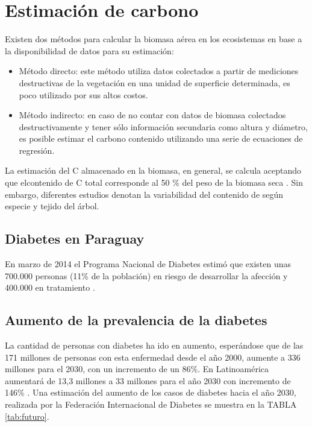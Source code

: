 \section{Estimaci\'on de carbono}
Existen dos m\'etodos para calcular la biomasa a\'erea en los ecosistemas en base a la disponibilidad de datos para su estimaci\'on\cite{pinaestimacion}: 
\begin{itemize}
	\item M\'etodo directo: este m\'etodo utiliza datos colectados a partir de mediciones destructivas de la vegetaci\'on en una unidad de superficie determinada, es poco utilizado por sus altos costos.
	
	\item M\'etodo indirecto: en caso de no contar con datos de biomasa colectados destructivamente y tener sólo información secundaria como altura y di\'ametro, es posible estimar el carbono contenido utilizando una serie de ecuaciones de regresi\'on.
\end{itemize}
La estimación del C almacenado en la biomasa, en general, se calcula aceptando que elcontenido de C total corresponde al 50 \% del peso de la biomasa seca \cite{slijepcevic2001loss}. Sin embargo, diferentes estudios denotan la variabilidad del contenido de seg\'un especie y tejido del \'arbol\cite{francis2000estimating}.


\subsection{Diabetes en Paraguay}
En marzo de 2014 el Programa Nacional de Diabetes estimó que existen unas 700.000 personas (11\% de la población) en riesgo de desarrollar la afección y 400.000 en tratamiento \cite{20medios}. 
\subsection{Aumento de la prevalencia de la diabetes}
La cantidad de personas con diabetes ha ido en aumento, esperándose que de las 171 millones de personas con esta enfermedad desde el año 2000, aumente a 336 millones para el 2030, con un incremento de un 86\%. En Latinoamérica aumentará de 13,3 millones a 33 millones para el año 2030 con incremento de 146\% \cite{wild2004global}. Una estimación del aumento de los casos de diabetes hacia el año 2030, realizada por la Federación Internacional de Diabetes \cite{idf} se muestra en la TABLA \ref{tab:futuro}.


